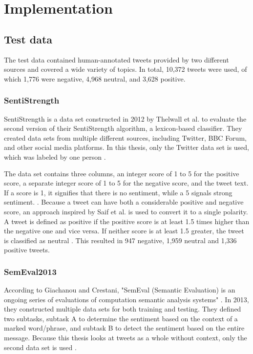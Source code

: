 \chapter{Implementation}
\label{cha:Chapter5_Implementation}
\section{Test data}
The test data contained human-annotated tweets provided by two different sources and covered a wide variety of topics. In total, 10,372 tweets were used, of which 1,776 were negative, 4,968 neutral, and 3,628 positive.

\subsection{SentiStrength}
SentiStrength is a data set constructed in 2012 by Thelwall et al. to evaluate the second version of their SentiStrength algorithm, a lexicon-based classifier. They created data sets from multiple different sources, including Twitter, BBC Forum, and other social media platforms. In this thesis, only the Twitter data set is used, which was labeled by one person \cite{10.1002/asi.21662}.

The data set contains three columns, an integer score of 1 to 5 for the positive score, a separate integer score of 1 to 5 for the negative score, and the tweet text. If a score is 1, it signifies that there is no sentiment, while a 5 signals strong sentiment. \cite{10.1002/asi.21662}. Because a tweet can have both a considerable positive and negative score, an approach inspired by Saif et al. is used to convert it to a single polarity. A tweet is defined as positive if the positive score is at least 1.5 times higher than the negative one and vice versa. If neither score is at least 1.5 greater, the tweet is classified as neutral \cite{oro40660}. This resulted in 947 negative, 1,959 neutral and 1,336 positive tweets.

\subsection{SemEval2013}
According to Giachanou and Crestani, "SemEval (Semantic Evaluation) is an ongoing series of evaluations of computation semantic analysis systems" \cite[p.~28:31]{DBLP:journals/csur/GiachanouC16}. In 2013, they constructed multiple data sets for both training and testing. They defined two subtasks, subtask A to determine the sentiment based on the context of a marked word/phrase, and subtask B to detect the sentiment based on the entire message. Because this thesis looks at tweets as a whole without context, only the second data set is used \cite{nakov-etal-2013-semeval}.

